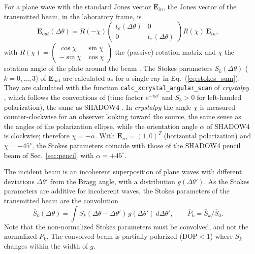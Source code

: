\documentclass{iucr}
\begin{document}
For a plane wave with the standard Jones vector $\mathbf{E}_{in}$, the Jones vector of the transmitted beam, in the laboratory frame, is
\begin{equation}\label{eq:jones_plate}
\mathbf{E}_{out}(\Delta\theta)=R(-\chi)\begin{pmatrix} t_\sigma(\Delta\theta) & 0\\ 0 & t_\pi(\Delta\theta)\end{pmatrix}R(\chi)\,\mathbf{E}_{in},
\end{equation}
with $R(\chi)=\begin{pmatrix}\cos\chi&\sin\chi\\-\sin\chi&\cos\chi\end{pmatrix}$ the (passive) rotation matrix and $\chi$ the rotation angle of the plate around the beam \cite{PolarizationDraft}. The Stokes parameters $S_k(\Delta\theta)$ ($k=0,\dots,3$) of $\mathbf{E}_{out}$ are calculated as for a single ray in Eq.~(\ref{eq:stokes_sum}). They are calculated with the function {\tt calc\_xcrystal\_angular\_scan} of {\it crystalpy} \cite{Guigay2024}, which follows the conventions of \cite{PolarizationDraft} (time factor $e^{-i\omega t}$ and $S_3>0$ for left-handed polarization), the same as SHADOW4 \cite{SanchezdelRio2026efields}. In {\it crystalpy} the angle $\chi$ is measured counter-clockwise for an observer looking toward the source, the same sense as the angles of the polarization ellipse, while the orientation angle $\alpha$ of SHADOW4 is clockwise; therefore $\chi=-\alpha$. With $\mathbf{E}_{in}=(1,0)^T$ (horizontal polarization) and $\chi=-45^\circ$, the Stokes parameters coincide with those of the SHADOW4 pencil beam of Sec.~\ref{sec:pencil} with $\alpha=+45^\circ$.

The incident beam is an incoherent superposition of plane waves with different deviations $\Delta\theta'$ from the Bragg angle, with a distribution $g(\Delta\theta')$. As the Stokes parameters are additive for incoherent waves, the Stokes parameters of the transmitted beam are the convolution
\begin{equation}\label{eq:convolution}
\overline{S}_k(\Delta\theta)=\int S_k(\Delta\theta-\Delta\theta')\,g(\Delta\theta')\,d\Delta\theta', \qquad \overline{P}_k=\overline{S}_k/\overline{S}_0 .
\end{equation}
Note that the non-normalized Stokes parameters must be convolved, and not the normalized $P_k$. The convolved beam is partially polarized (DOP$<1$) where $S_k$ changes within the width of $g$.
\end{document}
